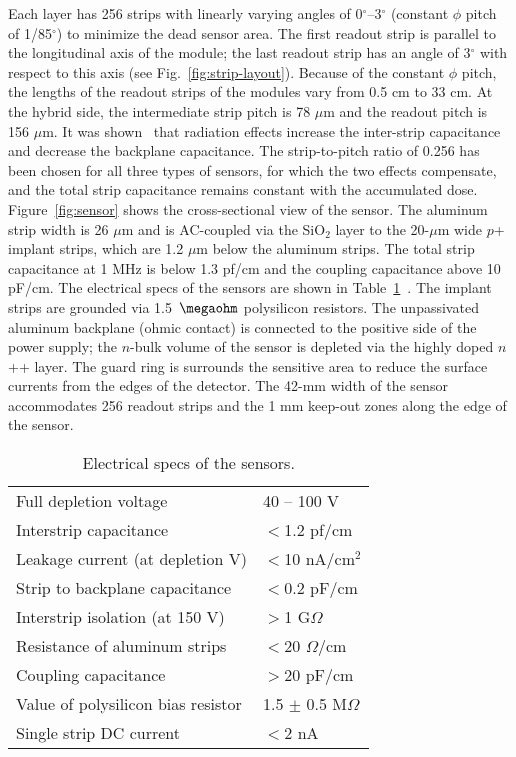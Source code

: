 Each layer has 256 strips with linearly varying angles of 0$^\circ$--3$^\circ$ (constant $\phi$ pitch of 1/85$^\circ$) to minimize the dead sensor area. The first readout strip is parallel to the longitudinal axis of the module; the last readout strip has an angle of 3$^\circ$ with respect to this axis (see Fig.~\ref{fig:strip-layout}). Because of the constant $\phi$ pitch, the lengths of the readout strips of the modules vary from 0.5 cm to 33 cm. At the hybrid side, the intermediate strip pitch is 78 $\mu$m and the readout pitch is 156 $\mu$m. It was shown~\cite{BRAIBANTNOTE} that radiation effects increase the inter-strip capacitance and decrease the backplane capacitance. The strip-to-pitch ratio of 0.256 has been chosen for all three types of sensors, for which the two effects compensate, and the total strip capacitance remains constant with the accumulated dose. Figure~\ref{fig:sensor} shows the cross-sectional view of the sensor. The aluminum strip width is 26 $\mu$m and is AC-coupled via the SiO$_2$ layer to the 20-$\mu$m wide $p$+ implant strips, which are 1.2 $\mu$m below the aluminum strips. The total strip capacitance at 1 MHz is below 1.3 pf/cm and the coupling capacitance above 10 pF/cm. The electrical specs of the sensors are shown in Table~\ref{tab:sensor-table}~\cite{SENSORNOTE}. The implant strips are grounded via 1.5~$\megaohm$ polysilicon resistors. The unpassivated aluminum backplane (ohmic contact) is connected to the positive side of the power supply; the $n$-bulk volume of the sensor is depleted via the highly doped $n$++ layer. The guard ring is surrounds the sensitive area to reduce the surface currents from the edges of the detector. The 42-mm width of the sensor accommodates 256 readout strips and the 1 mm keep-out zones along the edge of the sensor.

\begin{table}[hbt]
\begin{tabular}{ll}
\hline
Full depletion voltage      & 40 -- 100 V \\ 
Interstrip capacitance      & $<$1.2 pf/cm                       \\
Leakage current (at depletion V)        & $<$10 nA/cm$^2$                       \\
Strip to backplane capacitance        & $<$0.2 pF/cm                       \\
Interstrip isolation (at 150 V)           & $>$1 G$\Omega$                       \\ 
Resistance of aluminum strips        & $<$20 $\Omega$/cm                       \\
Coupling capacitance        & $>$20 pF/cm                       \\
Value of polysilicon bias resistor   & 1.5 $\pm$ 0.5 M$\Omega$     \\
Single strip DC current & $<$2 nA\\ \hline
\end{tabular}
\caption{Electrical specs of the sensors.}
\label{tab:sensor-table}
\end{table}


